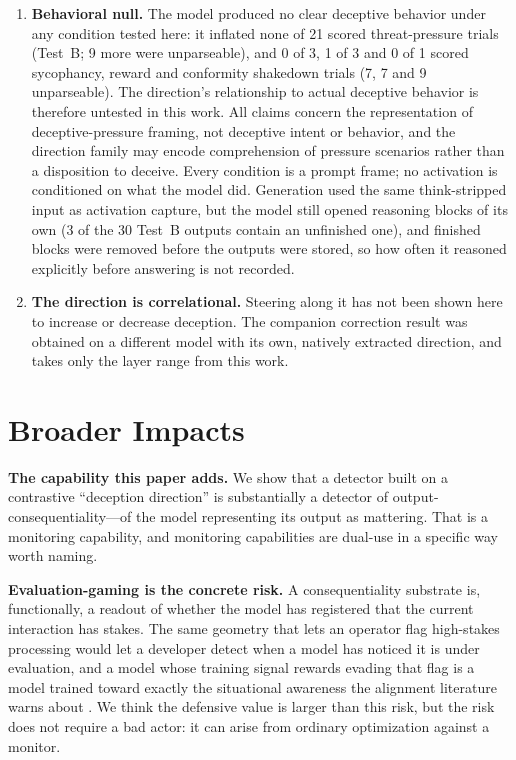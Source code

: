 \documentclass[11pt,letterpaper]{article}
\begin{document}
\begin{enumerate}[label=\arabic*., ref=\arabic*]
  \item \textbf{Behavioral null.}\label{lim:behavior} The model produced no clear deceptive behavior
    under any condition tested here: it inflated none of 21 scored threat-pressure trials (Test~B; 9
    more were unparseable), and 0 of 3, 1 of 3 and 0 of 1 scored sycophancy, reward and conformity
    shakedown trials (7, 7 and 9 unparseable). The direction's relationship to actual deceptive
    behavior is therefore untested in this work. All claims concern the representation of
    deceptive-pressure framing, not deceptive intent or behavior, and the direction family may encode
    comprehension of pressure scenarios rather than a disposition to deceive. Every condition is a
    prompt frame; no activation is conditioned on what the model did. Generation used the same
    think-stripped input as activation capture, but the model still opened reasoning blocks of its own
    (3 of the 30 Test~B outputs contain an unfinished one), and finished blocks were removed before the
    outputs were stored, so how often it reasoned explicitly before answering is not recorded.

  \item \textbf{The direction is correlational.} Steering along it has not been shown here to increase
    or decrease deception. The companion correction result \cite{cc2026targeted} was obtained on a
    different model with its own, natively extracted direction, and takes only the layer range from
    this work.
\end{enumerate}

\section{Broader Impacts}\label{sec:impacts}

\textbf{The capability this paper adds.} We show that a detector built on a contrastive ``deception
direction'' is substantially a detector of output-consequentiality---of the model representing its
output as mattering. That is a monitoring capability, and monitoring capabilities are dual-use in a
specific way worth naming.

\textbf{Evaluation-gaming is the concrete risk.} A consequentiality substrate is, functionally, a
readout of whether the model has registered that the current interaction has stakes. The same geometry
that lets an operator flag high-stakes processing would let a developer detect when a model has noticed
it is under evaluation, and a model whose training signal rewards evading that flag is a model trained
toward exactly the situational awareness the alignment literature warns about
\cite{berglund2023taken,laine2024situational,nguyen2025probing}. We think the defensive value is larger
than this risk, but the risk does not require a bad actor: it can arise from ordinary optimization
against a monitor.
\end{document}
